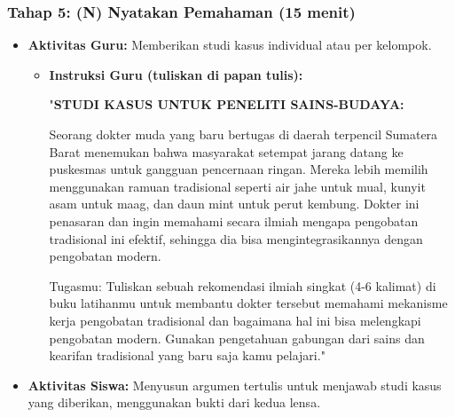 \documentclass[a4paper,12pt]{article}
\begin{document}
\subsubsection{Tahap 5: (N) Nyatakan Pemahaman (15 menit)}
\begin{itemize}
\item \textbf{Aktivitas Guru:} Memberikan studi kasus individual atau per kelompok.
    \begin{itemize}
    \item \textbf{Instruksi Guru (tuliskan di papan tulis):}
    
    "\textbf{STUDI KASUS UNTUK PENELITI SAINS-BUDAYA:}
    
    Seorang dokter muda yang baru bertugas di daerah terpencil Sumatera Barat menemukan bahwa masyarakat setempat jarang datang ke puskesmas untuk gangguan pencernaan ringan. Mereka lebih memilih menggunakan ramuan tradisional seperti air jahe untuk mual, kunyit asam untuk maag, dan daun mint untuk perut kembung. Dokter ini penasaran dan ingin memahami secara ilmiah mengapa pengobatan tradisional ini efektif, sehingga dia bisa mengintegrasikannya dengan pengobatan modern.
    
    Tugasmu: Tuliskan sebuah rekomendasi ilmiah singkat (4-6 kalimat) di buku latihanmu untuk membantu dokter tersebut memahami mekanisme kerja pengobatan tradisional dan bagaimana hal ini bisa melengkapi pengobatan modern. Gunakan pengetahuan gabungan dari sains dan kearifan tradisional yang baru saja kamu pelajari."
    \end{itemize}
\item \textbf{Aktivitas Siswa:} Menyusun argumen tertulis untuk menjawab studi kasus yang diberikan, menggunakan bukti dari kedua lensa.
\end{itemize}
\end{document}
